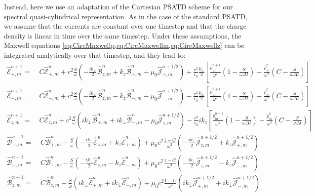\documentclass[1p,times]{elsarticle}
\newcommand{\tB}[2]{\spectral{B}_{#1,m}^{#2}}
\newcommand{\tE}[2]{\spectral{E}_{#1,m}^{#2}}
\newcommand{\tj}[2]{\spectral{J}_{#1,m}^{#2}}
\newcommand{\trho}[1]{\spectral{\rho}_{m}^{#1}}
\newcommand{\spectral}[1]{\hat{\mathcal{#1}}}
\begin{document}
Instead, here we use an adaptation of the Cartesian PSATD scheme \cite{Haber}
for our spectral quasi-cylindrical representation. As in the case of the standard
PSATD, we assume that the currents are constant over one timestep and
that the charge density is linear in time over the same timestep. Under these
assumptions, the Maxwell equations \cref{eq:CircMaxwellp,eq:CircMaxwellm,eq:CircMaxwellz} can be integrated
analytically over that timestep, and they lead to:
\begin{subequations}
\label{eq:PSATD1}
\begin{align}
\tE{+}{n+1} = \; & C \tE{+}{n} + 
c^2\frac{S}{\omega}\left(-\frac{ik_\perp }{2} \tB{z}{n} + k_z\tB{+}{n}
- \mu_0 \tj{+}{n+1/2} \right) + \frac{c^2}{\epsilon_0}
\frac{k_\perp}{2}\left[ \frac{\trho{n+1}}{\omega^2}\left(
  1 - \frac{S}{\omega\Delta t}\right) -
\frac{\trho{n}}{\omega^2}\left( C -\frac{S}{\omega\Delta t}\right)\right]  & \\
\tE{-}{n+1} =\; & C \tE{-}{n} +
c^2\frac{S}{\omega}\left(- \frac{ik_\perp }{2} \tB{z}{n} - k_z\tB{-}{n}
- \mu_0 \tj{-}{n+1/2} \right) - \frac{c^2}{\epsilon_0}
\frac{k_\perp}{2}\left[ \frac{\trho{n+1}}{\omega^2}\left(
  1 - \frac{S}{\omega\Delta t}\right) - \frac{\trho{n}}{\omega^2}
\left( C - \frac{S}{\omega\Delta t}\right)\right]  &\\
\tE{z}{n+1} =\; & C \tE{z}{n} + 
c^2\frac{S}{\omega}\left(ik_\perp \tB{+}{n} + ik_\perp \tB{-}{n}
- \mu_0 \tj{z}{n+1/2} \right) - \frac{c^2}{\epsilon_0}
ik_z\left[ \frac{\trho{n+1}}{\omega^2}\left(
  1 - \frac{S}{\omega\Delta t}\right) - \frac{\trho{n}}{\omega^2}
\left( C - \frac{S}{\omega\Delta t}\right)\right]  &
\end{align}
\end{subequations}
\begin{subequations}
\label{eq:PSATD2}
\begin{align}
\tB{+}{n+1} = \; & C \tB{+}{n} - 
\frac{S}{\omega}\left(-\frac{ik_\perp }{2} \tE{z}{n} + k_z\tE{+}{n}
\right) + \mu_0 c^2\frac{1-C}{\omega^2} \left( -\frac{ik_\perp }{2}
  \tj{z}{n+1/2} + k_z \tj{+}{n+1/2} \right)& \\
\tB{-}{n+1} =\; & C \tB{-}{n} - 
\frac{S}{\omega}\left(- \frac{ik_\perp }{2} \tE{z}{n} - k_z\tE{-}{n}
\right) + \mu_0 c^2\frac{1-C}{\omega^2} \left( - \frac{ik_\perp }{2}
  \tj{z}{n+1/2} - k_z \tj{-}{n+1/2} \right) &\\
\tB{z}{n+1} =\; & C \tB{z}{n} - 
\frac{S}{\omega}\left(ik_\perp \tE{+}{n} + ik_\perp \tE{-}{n}
\right) + \mu_0 c^2\frac{1-C}{\omega^2} \left( ik_\perp
  \tj{+}{n+1/2} + ik_\perp \tj{-}{n+1/2} \right)&
\end{align}
\end{subequations}
\end{document}
